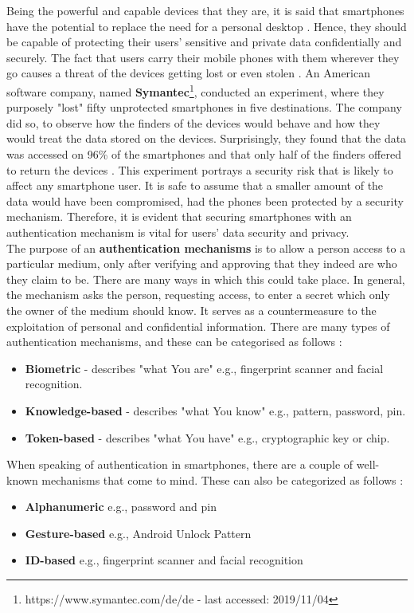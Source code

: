 Being the powerful and capable devices that they are, it is said that smartphones have the potential to replace the need for a personal desktop \cite{Alsaleh}. Hence, they should be capable of protecting their users' sensitive and private data confidentially and securely. The fact that users carry their mobile phones with them wherever they go causes a threat of the devices getting lost or even stolen \cite{Egelman:2014:YRL:2660267.2660273}. An American software company, named \textbf{Symantec}\footnote{https://www.symantec.com/de/de - last accessed: 2019/11/04}, conducted an experiment, where they purposely "lost" fifty unprotected smartphones in five destinations. The company did so, to observe how the finders of the devices would behave and how they would treat the data stored on the devices. Surprisingly, they found that the data was accessed on 96\% of the smartphones and that only half of the finders offered to return the devices \cite{symantec}.  This experiment portrays a security risk that is likely to affect any smartphone user.  It is safe to assume that a smaller amount of the data would have been compromised, had the phones been protected by a security mechanism. Therefore, it is evident that securing smartphones with an authentication mechanism is vital for users' data security and privacy.\\

The purpose of an \textbf{authentication mechanisms} is to allow a person access to a particular medium, only after verifying and approving that they indeed are who they claim to be. There are many ways in which this could take place. In general, the mechanism asks the person, requesting access, to enter a secret which only the owner of the medium should know. It serves as a countermeasure to the exploitation of personal and confidential information. There are many types of authentication mechanisms, and these can be categorised as follows \cite{gorman}: 
\begin{itemize}
    \item \textbf{Biometric} - describes "what You are" e.g., fingerprint scanner and facial recognition.
    \item \textbf{Knowledge-based} - describes "what You know" e.g., pattern, password, pin.
    \item \textbf{Token-based} - describes "what You have" e.g., cryptographic key or chip.
\end{itemize}


When speaking of authentication in smartphones, there are a couple of well-known mechanisms that come to mind. These can also be categorized as follows \cite{ediss20251,gorman} : 
\begin{itemize}
    \item \textbf{Alphanumeric} e.g., password and pin
    \item \textbf{Gesture-based} e.g., Android Unlock Pattern
    \item \textbf{ID-based} e.g., fingerprint scanner and facial recognition 
\end{itemize}

